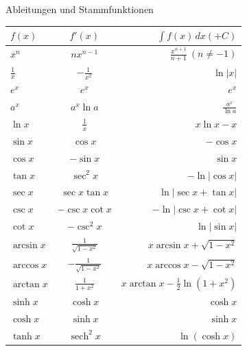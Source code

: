 \begin{minipage}{\linewidth}
\Tab Ableitungen und Stammfunktionen

\begin{tabular}{l c r}
    $f(x)$ & $f'(x)$ & $\int f(x) \, dx (+ C)$ \\
    \hline
    $x^n$ & $n x^{n-1}$ & $\frac{x^{n+1}}{n+1} \ (n \neq -1)$ \\[1ex]
    $\frac{1}{x}$ & $-\frac{1}{x^2}$ & $\ln|x|$ \\[1ex]
    $e^x$ & $e^x$ & $e^x$ \\[1ex]
    $a^x$ & $a^x \ln a$ & $\frac{a^x}{\ln a}$ \\[1ex]
    $\ln x$ & $\frac{1}{x}$ & $x \ln x - x$ \\[0.5ex]
    \hline
    $\sin x$ & $\cos x$ & $-\cos x$ \\[1ex]
    $\cos x$ & $-\sin x$ & $\sin x$ \\[1ex]
    $\tan x$ & $\sec^2 x$ & $-\ln|\cos x|$ \\[1ex]
    $\sec x$ & $\sec x \tan x$ & $\ln|\sec x + \tan x|$ \\[1ex]
    $\csc x$ & $-\csc x \cot x$ & $-\ln|\csc x + \cot x|$ \\[1ex]
    $\cot x$ & $-\csc^2 x$ & $\ln|\sin x|$ \\
    \hline
    $\arcsin x$ & $\frac{1}{\sqrt{1-x^2}}$ & $x \arcsin x + \sqrt{1-x^2}$ \\[1ex]
    $\arccos x$ & $-\frac{1}{\sqrt{1-x^2}}$ & $x \arccos x - \sqrt{1-x^2}$ \\[1ex]
    $\arctan x$ & $\frac{1}{1+x^2}$ & $x \arctan x - \frac{1}{2}\ln(1+x^2)$ \\[0.5ex]
    \hline
    $\sinh x$ & $\cosh x$ & $\cosh x$ \\[1ex]
    $\cosh x$ & $\sinh x$ & $\sinh x$ \\[1ex]
    $\tanh x$ & $\operatorname{sech}^2 x$ & $\ln(\cosh x)$ \\
\end{tabular}
\end{minipage}

